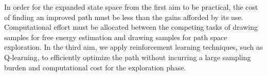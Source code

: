 In order for the expanded state space from the first aim to be practical, the cost of finding an improved path must be less than the gains afforded by its use. 
Computational effort must be allocated between the competing tasks of drawing samples for free energy estimation and drawing samples for path space exploration.
In the third aim, we apply reinforcement learning techniques, such as Q-learning\cite{watkins1992q}, to efficiently optimize the path without incurring a large sampling burden and computational cost for the exploration phase.
